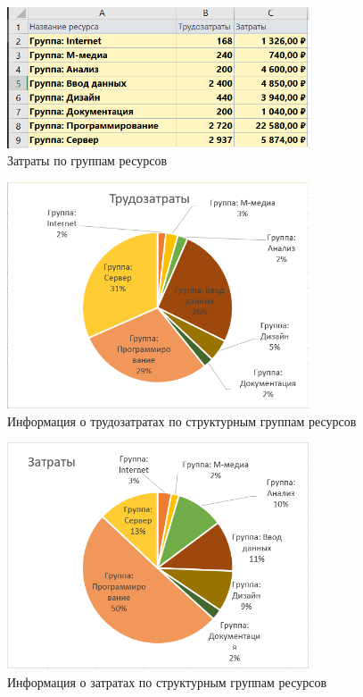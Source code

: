 \begin{figure}[H]
	\centering
	\includegraphics[width=0.8\textwidth]{img/content/table.png}
	\caption{Затраты по группам ресурсов}
\end{figure}

\begin{figure}[H]
	\centering
	\includegraphics[width=0.8\textwidth]{img/content/diagram_hours.png}
	\caption{Информация о трудозатратах по структурным группам ресурсов}
\end{figure}

\begin{figure}[H]
	\centering
	\includegraphics[width=0.8\textwidth]{img/content/diagram_money.png}
	\caption{Информация о затратах по структурным группам ресурсов}
\end{figure}

